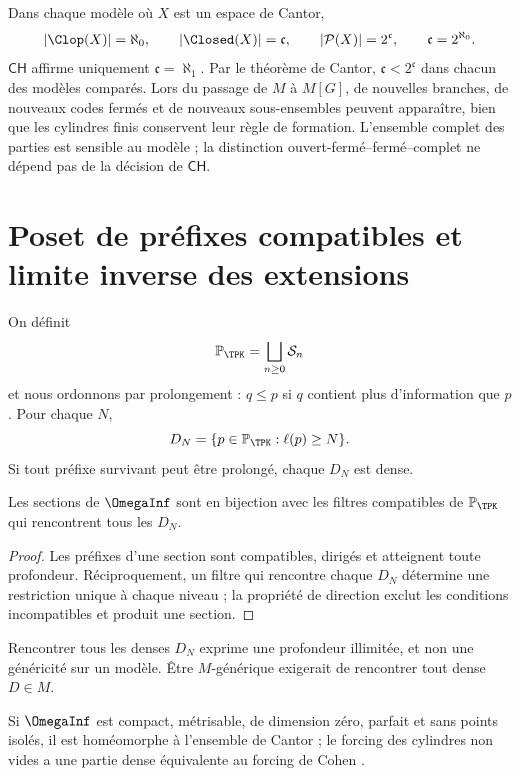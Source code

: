 Dans chaque modèle où \(X\) est un espace de Cantor,
\[
  |\Clop(X)|=\aleph_0,\qquad
  |\Closed(X)|=\mathfrak c,\qquad
  |\mathcal P(X)|=2^{\mathfrak c},
  \qquad \mathfrak c=2^{\aleph_0}.
\]
\(\mathsf{CH}\) affirme uniquement \(\mathfrak c=\aleph_1\). Par le théorème
de Cantor, \(\mathfrak c<2^{\mathfrak c}\) dans chacun des modèles
comparés. Lors du passage de \(M\) à \(M[G]\), de nouvelles branches, de nouveaux
codes fermés et de nouveaux sous-ensembles peuvent apparaître, bien que les cylindres finis
conservent leur règle de formation. L'ensemble complet des parties est sensible au modèle ; la
distinction ouvert-fermé--fermé--complet ne dépend pas de la décision de \(\mathsf{CH}\).

\section{Poset de préfixes compatibles et limite inverse des extensions}

On définit
\[
  \mathbb P_{\TPK}=\bigsqcup_{n\ge0}\mathcal S_n
\]
et nous ordonnons par prolongement : \(q\le p\) si \(q\) contient plus d'information
que \(p\). Pour chaque \(N\),
\[
  D_N=\{p\in\mathbb P_{\TPK}:\ell(p)\ge N\}.
\]
Si tout préfixe survivant peut être prolongé, chaque \(D_N\) est dense.

\begin{theorem}
Les sections de \(\OmegaInf\) sont en bijection avec les filtres compatibles
de \(\mathbb P_{\TPK}\) qui rencontrent tous les \(D_N\).
\end{theorem}

\begin{proof}
Les préfixes d'une section sont compatibles, dirigés et atteignent toute
profondeur. Réciproquement, un filtre qui rencontre chaque \(D_N\) détermine une
restriction unique à chaque niveau ; la propriété de direction exclut les conditions
incompatibles et produit une section.
\end{proof}

Rencontrer tous les denses \(D_N\) exprime une profondeur illimitée, et non
une généricité sur un modèle. Être \(M\)-générique exigerait de rencontrer tout
dense \(D\in M\).

\begin{proposition}
Si \(\OmegaInf\) est compact, métrisable, de dimension zéro, parfait et sans
points isolés, il est homéomorphe à l'ensemble de Cantor ; le forcing des cylindres non vides
a une partie dense équivalente au forcing de Cohen
\citep{cohen1963,cohen1964}.
\end{proposition}

